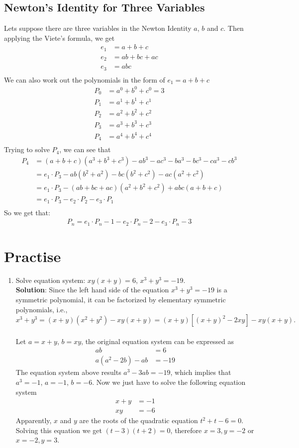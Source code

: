 \documentclass[11pt, oneside]{article}   	%
\begin{document}
\subsection{Newton's Identity for Three Variables}
Lets suppose there are three variables in the Newton Identity $a$, $b$ and $c$.
Then applying the Viete's formula, we get
\begin{align*}
e_1&=a+b+c\\
e_2&=ab+bc+ac\\
e_3&=abc\\
\end{align*} 
We can also work out  the polynomials in the form of $e_1=a+b+c$
\begin{align*}
P_0&=a^0+b^0+c^0=3\\
P_1&=a^1+b^1+c^1\\
P_2&=a^2+b^2+c^2\\
P_3&=a^3+b^3+c^3\\
P_4&=a^4+b^4+c^4\\
\end{align*} 
Trying to solve $P_4$, we can see that
\begin{align*}
P_4&=(a+b+c)(a^3+b^3+c^3)-ab^3-ac^3-ba^3-bc^3-ca^3-cb^3\\
&=e_1 \cdot P_3 -ab(b^2+a^2)-bc(b^2+c^2)-ac(a^2+c^2)\\
&=e_1 \cdot P_3 -(ab+bc+ac)(a^2+b^2+c^2)+abc(a+b+c)\\
&=e_1 \cdot P_3 - e_2 \cdot P_2 - e_3 \cdot P_1\\
\end{align*} 
So we get that:
\begin{align*}
P_n=e_1 \cdot P_n-1 - e_2 \cdot P_n-2 - e_3 \cdot P_n-3
\end{align*} 

\section{Practise}
\begin{enumerate}
\item
Solve equation system: $xy(x+y)=6$, $x^3+y^3=-19$.\\
\textbf{Solution}: 
Since the left hand side of the equation $x^3+y^3=-19$ is a symmetric polynomial, it can be factorized by elementary symmetric polynomials, i.e.,
\[x^3+y^3 =  (x+y)(x^2+y^2)-xy(x+y) = (x+y)[(x+y)^2-2xy]-xy(x+y).\] \\
Let $a=x+y$, $b=xy$, the original equation system can be expressed as 
\begin{align*}
ab &= 6\\
a(a^2-2b)-ab&=-19
\end{align*}
The equation system above results $a^3-3ab=-19$, which implies that $a^3=-1$, $a=-1$, $b=-6$.
Now we just have to solve the following equation system
\begin{align*}
x+y&=-1\\
xy&=-6
\end{align*}
Apparently, $x$ and $y$ are the roots of the quadratic equation $t^2+t-6=0$. Solving this equation we get $(t-3)(t+2)=0$, therefore $x=3, y=-2$ or $x=-2, y=3$.
\end{enumerate}
\end{document}
